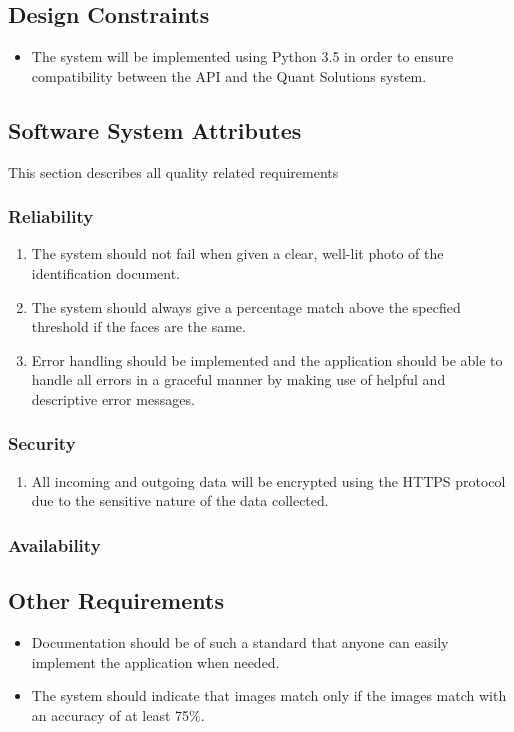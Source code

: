 \documentclass{article}
\begin{document}
		\subsection{Design Constraints}\label{subsec:specific-constraints}
		\begin{itemize}
		    \item The system will be implemented using Python 3.5 in order to ensure compatibility between the API and the Quant Solutions system.
		\end{itemize}

		\subsection{Software System Attributes}\label{subsec:specific-software}
		This section describes all quality related requirements
		\subsubsection{Reliability}
		\begin{enumerate}
		    \item The system should not fail when given a clear, well-lit photo of the identification document.
		    \item The system should always give a percentage match above the specfied threshold if the faces are the same.
		    \item Error handling should be implemented and the application should be able to handle all errors in a graceful manner by making use of helpful and descriptive error messages.
		\end{enumerate}
		\subsubsection{Security}
		\begin{enumerate}
		    \item All incoming and outgoing data will be encrypted using the HTTPS protocol due to the sensitive nature of the data collected.
		\end{enumerate}
		\subsubsection{Availability}

		\subsection{Other Requirements}\label{subsec:specific-other}
		\begin{itemize}
            \item Documentation should be of such a standard that anyone can easily implement the application when needed.
            \item The system should indicate that images match only if the images match with an accuracy of at least 75\%.
		\end{itemize}
\end{document}
